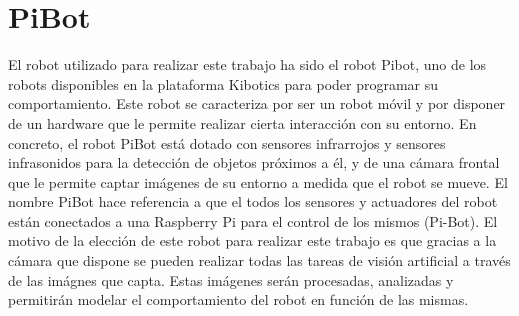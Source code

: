 \documentclass{report}
\begin{document}
\section{PiBot}
El robot utilizado para realizar este trabajo ha sido el robot Pibot, uno de los robots disponibles en la plataforma Kibotics para poder programar su comportamiento. Este robot se caracteriza por ser un robot móvil y por disponer de un hardware que le permite realizar cierta interacción con su entorno. En concreto, el robot PiBot está dotado con sensores infrarrojos y sensores infrasonidos para la detección de objetos próximos a él, y de una cámara frontal que le permite captar imágenes de su entorno a medida que el robot se mueve. El nombre PiBot hace referencia a que el todos los sensores y actuadores del robot están conectados a una Raspberry Pi para el control de los mismos (Pi-Bot). El motivo de la elección de este robot para realizar este trabajo es que gracias a la cámara que dispone se pueden realizar todas las tareas de visión artificial a través de las imágnes que capta. Estas imágenes serán procesadas, analizadas y permitirán modelar el comportamiento del robot en función de las mismas.
\end{document}

